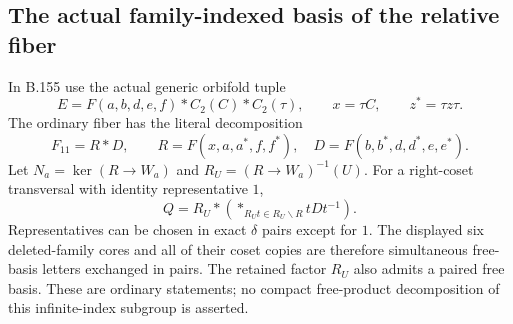 \subsection*{The actual family-indexed basis of the relative fiber}
\label{stmt:B156}
In B.155 use the actual generic orbifold tuple
\[
 E=F(a,b,d,e,f)*C_2(C)*C_2(\tau),\qquad
 x=\tau C,\qquad z^*=\tau z\tau.
\]
The ordinary fiber has the literal decomposition
\begin{equation}\label{eq:B156-factors}
 F_{11}=R*D,\qquad
 R=F(x,a,a^*,f,f^*),\quad
 D=F(b,b^*,d,d^*,e,e^*).
\end{equation}
Let $N_a=\ker(R\to W_a)$ and $R_U=(R\to W_a)^{-1}(U)$.
For a right-coset transversal with identity representative $1$,
\begin{equation}\label{eq:B156-star}
 Q=R_U*
 \left(*_{R_Ut\in R_U\backslash R}tDt^{-1}\right).
\end{equation}
Representatives can be chosen in exact $\delta$ pairs except for $1$.
The displayed six deleted-family cores and all of their coset copies
are therefore simultaneous free-basis letters exchanged in pairs.
The retained factor $R_U$ also admits a paired free basis.
These are ordinary statements; no compact free-product decomposition
of this infinite-index subgroup is asserted.
